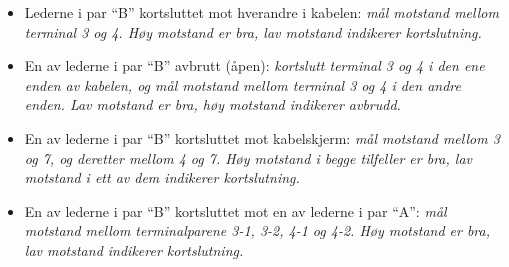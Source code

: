 





\begin{itemize}
\item{} Lederne i par ``B'' kortsluttet mot hverandre i kabelen: {\it mål motstand mellom terminal 3 og 4. Høy motstand er bra, lav motstand indikerer kortslutning.}
\vskip 10pt
\item{} En av lederne i par ``B'' avbrutt (åpen): {\it kortslutt terminal 3 og 4 i den ene enden av kabelen, og mål motstand mellom terminal 3 og 4 i den andre enden. Lav motstand er bra, høy motstand indikerer avbrudd.}
\vskip 10pt
\item{} En av lederne i par ``B'' kortsluttet mot kabelskjerm: {\it mål motstand mellom 3 og 7, og deretter mellom 4 og 7. Høy motstand i begge tilfeller er bra, lav motstand i ett av dem indikerer kortslutning.}
\vskip 10pt
\item{} En av lederne i par ``B'' kortsluttet mot en av lederne i par ``A'': {\it mål motstand mellom terminalparene 3-1, 3-2, 4-1 og 4-2. Høy motstand er bra, lav motstand indikerer kortslutning.}
\end{itemize}


